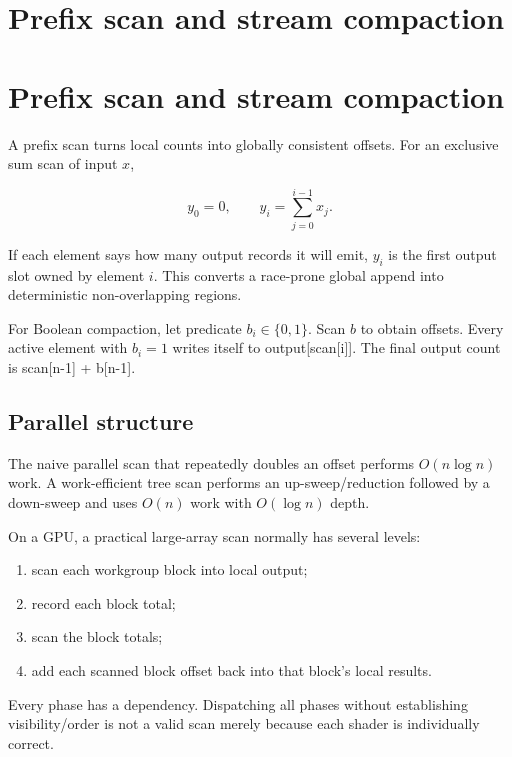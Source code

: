\hypertarget{appendix-f2ee4d086415}{}
\section*{Prefix scan and stream compaction}
\section{Prefix scan and stream compaction}\label{appendix-f2ee4d086415-prefix-scan-and-stream-compaction}

A prefix scan turns local counts into globally consistent offsets. For an exclusive sum scan of input \(x\),

\[
y_0=0,
\qquad
y_i=\sum_{j=0}^{i-1}x_j.
\]

If each element says how many output records it will emit, \(y_i\) is the first output slot owned by element \(i\). This converts a race-prone global append into deterministic non-overlapping regions.

For Boolean compaction, let predicate \(b_i\in\{0,1\}\). Scan \(b\) to obtain offsets. Every active element with \(b_i=1\) writes itself to output{[}scan{[}i{]}{]}. The final output count is scan{[}n-1{]} + b{[}n-1{]}.

\subsection{Parallel structure}\label{appendix-f2ee4d086415-parallel-structure}

The naive parallel scan that repeatedly doubles an offset performs \(O(n\log n)\) work. A work-efficient tree scan performs an up-sweep/reduction followed by a down-sweep and uses \(O(n)\) work with \(O(\log n)\) depth.

On a GPU, a practical large-array scan normally has several levels:

\begin{enumerate}
\def\labelenumi{\arabic{enumi}.}
\tightlist
\item
  scan each workgroup block into local output;
\item
  record each block total;
\item
  scan the block totals;
\item
  add each scanned block offset back into that block's local results.
\end{enumerate}

Every phase has a dependency. Dispatching all phases without establishing visibility/order is not a valid scan merely because each shader is individually correct.

